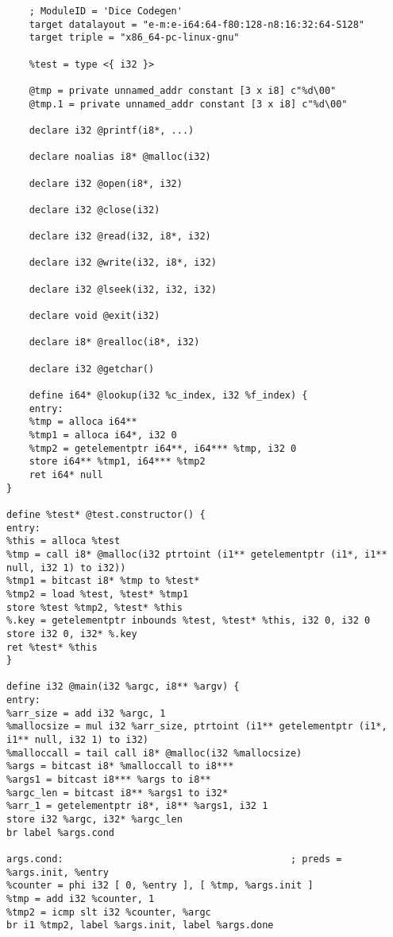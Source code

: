 \begin{verbatim}
	; ModuleID = 'Dice Codegen'
	target datalayout = "e-m:e-i64:64-f80:128-n8:16:32:64-S128"
	target triple = "x86_64-pc-linux-gnu"
	
	%test = type <{ i32 }>
	
	@tmp = private unnamed_addr constant [3 x i8] c"%d\00"
	@tmp.1 = private unnamed_addr constant [3 x i8] c"%d\00"
	
	declare i32 @printf(i8*, ...)
	
	declare noalias i8* @malloc(i32)
	
	declare i32 @open(i8*, i32)
	
	declare i32 @close(i32)
	
	declare i32 @read(i32, i8*, i32)
	
	declare i32 @write(i32, i8*, i32)
	
	declare i32 @lseek(i32, i32, i32)
	
	declare void @exit(i32)
	
	declare i8* @realloc(i8*, i32)
	
	declare i32 @getchar()
	
	define i64* @lookup(i32 %c_index, i32 %f_index) {
	entry:
	%tmp = alloca i64**
	%tmp1 = alloca i64*, i32 0
	%tmp2 = getelementptr i64**, i64*** %tmp, i32 0
	store i64** %tmp1, i64*** %tmp2
	ret i64* null
}

define %test* @test.constructor() {
entry:
%this = alloca %test
%tmp = call i8* @malloc(i32 ptrtoint (i1** getelementptr (i1*, i1** null, i32 1) to i32))
%tmp1 = bitcast i8* %tmp to %test*
%tmp2 = load %test, %test* %tmp1
store %test %tmp2, %test* %this
%.key = getelementptr inbounds %test, %test* %this, i32 0, i32 0
store i32 0, i32* %.key
ret %test* %this
}

define i32 @main(i32 %argc, i8** %argv) {
entry:
%arr_size = add i32 %argc, 1
%mallocsize = mul i32 %arr_size, ptrtoint (i1** getelementptr (i1*, i1** null, i32 1) to i32)
%malloccall = tail call i8* @malloc(i32 %mallocsize)
%args = bitcast i8* %malloccall to i8***
%args1 = bitcast i8*** %args to i8**
%argc_len = bitcast i8** %args1 to i32*
%arr_1 = getelementptr i8*, i8** %args1, i32 1
store i32 %argc, i32* %argc_len
br label %args.cond

args.cond:                                        ; preds = %args.init, %entry
%counter = phi i32 [ 0, %entry ], [ %tmp, %args.init ]
%tmp = add i32 %counter, 1
%tmp2 = icmp slt i32 %counter, %argc
br i1 %tmp2, label %args.init, label %args.done


\end{verbatim}
